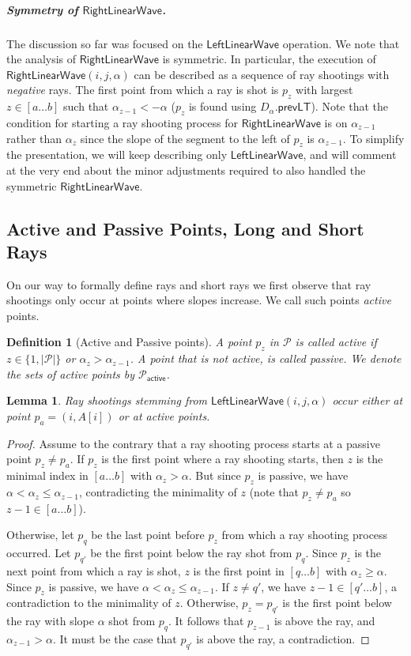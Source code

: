 \documentclass[10pt,a4paper]{article}
\newtheorem{lemma}[theorem]{Lemma}
\newtheorem{definition}[theorem]{Definition}
\newcommand{\LLW}{\mathsf{LeftLinearWave}}
\newcommand{\RLW}{\mathsf{RightLinearWave}}
\newcommand{\longrange}{\text{long }}
\newcommand{\prevLT}{\mathsf{prevLT}}
\renewcommand{\P}{\mathcal{P}}
\newcommand{\AP}{\P_{\mathsf{active}}}
\newcommand{\para}[1]{\vspace{-0.1in} \subparagraph*{#1}}
\begin{document}
\para{Symmetry of $\RLW$.}
The discussion so far was focused on the $\LLW$ operation.
We note that the analysis of $\RLW$ is symmetric.
In particular, the execution of $\RLW(i,j,\alpha)$ can be described as a sequence of ray shootings with \emph{negative} rays.
The first point from which a ray is shot is $p_z$ with largest $z\in[a\ldots b]$ such that $\alpha_{z-1}<-\alpha$ ($p_z$ is found using $D_{\alpha}.\prevLT$). 
Note that the condition for starting a ray shooting process for $\RLW$ is on $\alpha_{z-1}$ rather than $\alpha_z$ since the slope of the segment to the left of $p_z$ is $\alpha_{z-1}$.
To simplify the presentation, we will keep describing only $\LLW$, and will comment at the very end about the minor adjustments required to also handled the symmetric $\RLW$. 

\subsection{Active and Passive Points, Long and Short Rays}
On our way to formally define \longrange rays and short rays we first observe that ray shootings only occur at points where slopes increase. We call such points {\em active} points.
\begin{definition}[Active and Passive points]\label{def:activepoints}
A point $p_z$ in $\P$ is called \emph{active} if $z\in\{1,|\P|\}$ or $\alpha_z>\alpha_{z-1}$.
A point that is not active, is called \emph{passive}.
We denote the sets of active points by $\AP$.
\end{definition}

\begin{lemma}\label{lem:activerays}
Ray shootings stemming from $\LLW(i,j,\alpha)$ occur either at point $p_a=(i,A[i])$ or at active points. 
   
\end{lemma}
\begin{proof}
Assume to the contrary that a ray shooting process starts at a passive point $p_z \neq p_a$.
 If $p_z$ is the first point where a ray shooting starts, then $z$ is the minimal index in $[a\ldots b]$ with $\alpha_z > \alpha$. But since $p_z$ is passive, we have $\alpha < \alpha_{z} \le \alpha_{z-1}$, contradicting the minimality of $z$ (note that $p_{z} \neq p_a$ so $z-1 \in [a\ldots b]$).

Otherwise, let $p_q$ be the last point before $p_z$ from which a ray shooting process occurred.
Let $p_{q'}$ be the first point below the ray shot from $p_q$. Since $p_z$ is the next point from which a ray is shot, $z$ is the first point in $[q \ldots b]$ with $\alpha_z \ge \alpha$.
Since $p_z$ is passive, we have $\alpha < \alpha_{z} \le \alpha_{z-1}$.
If $z \neq q'$, we have $z-1 \in [q'\ldots b]$, a contradiction to the minimality of $z$.
Otherwise, $p_z = p_{q'}$ is the first point below the ray with slope $\alpha$ shot from $p_q$. 
It follows that $p_{z-1}$ is above the ray, and $\alpha_{z-1} > \alpha$.
It must be the case that $p_{q'}$ is above the ray, a contradiction.
\end{proof}
\end{document}
